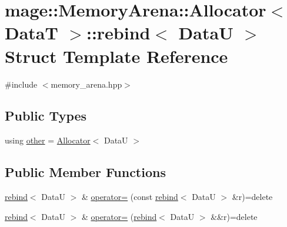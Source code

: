 \hypertarget{structmage_1_1_memory_arena_1_1_allocator_1_1rebind}{}\section{mage\+:\+:Memory\+Arena\+:\+:Allocator$<$ DataT $>$\+:\+:rebind$<$ DataU $>$ Struct Template Reference}
\label{structmage_1_1_memory_arena_1_1_allocator_1_1rebind}


{\ttfamily \#include $<$memory\+\_\+arena.\+hpp$>$}

\subsection*{Public Types}
\begin{DoxyCompactItemize}
\item 
using \hyperlink{structmage_1_1_memory_arena_1_1_allocator_1_1rebind_aad55bf384b9a95ae1c2158f1d2afe180}{other} = \hyperlink{structmage_1_1_memory_arena_1_1_allocator}{Allocator}$<$ DataU $>$
\end{DoxyCompactItemize}
\subsection*{Public Member Functions}
\begin{DoxyCompactItemize}
\item 
\hyperlink{structmage_1_1_memory_arena_1_1_allocator_1_1rebind}{rebind}$<$ DataU $>$ \& \hyperlink{structmage_1_1_memory_arena_1_1_allocator_1_1rebind_a2d7fe95797686c132cc76cf89d9bb259}{operator=} (const \hyperlink{structmage_1_1_memory_arena_1_1_allocator_1_1rebind}{rebind}$<$ DataU $>$ \&r)=delete
\item 
\hyperlink{structmage_1_1_memory_arena_1_1_allocator_1_1rebind}{rebind}$<$ DataU $>$ \& \hyperlink{structmage_1_1_memory_arena_1_1_allocator_1_1rebind_aa8013303077d1d9a193730edf3239427}{operator=} (\hyperlink{structmage_1_1_memory_arena_1_1_allocator_1_1rebind}{rebind}$<$ DataU $>$ \&\&r)=delete
\end{DoxyCompactItemize}
